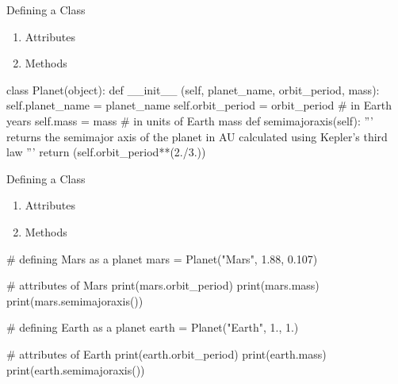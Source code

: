 \documentclass[11pt]{beamer}
\begin{document}
\begin{frame}[fragile]{Defining a Class}
\begin{enumerate}
\item Attributes
\item Methods
\end{enumerate}
\pause

\tiny
\begin{semiverbatim}
class Planet(object):
    def __init__ (self, planet_name, orbit_period, mass):
        self.planet_name = planet_name 
        self.orbit_period = orbit_period  # in Earth years
        self.mass = mass # in units of Earth mass
\pause    
    def semimajoraxis(self):
        '''
        returns the semimajor axis of the planet in AU
        calculated using Kepler's third law 
        '''
        return (self.orbit_period**(2./3.))

\end{semiverbatim}
\end{frame}

\begin{frame}[fragile]{Defining a Class}
\begin{enumerate}
\item Attributes
\item Methods
\end{enumerate}

\tiny
\begin{semiverbatim}
# defining Mars as a planet 
mars = Planet("Mars", 1.88, 0.107)

# attributes of Mars 
print(mars.orbit_period)
print(mars.mass)
print(mars.semimajoraxis())

\pause
# defining Earth as a planet 
earth = Planet("Earth", 1., 1.)

# attributes of Earth 
print(earth.orbit_period)
print(earth.mass)
print(earth.semimajoraxis())
\end{semiverbatim}
\end{frame}
\end{document}
